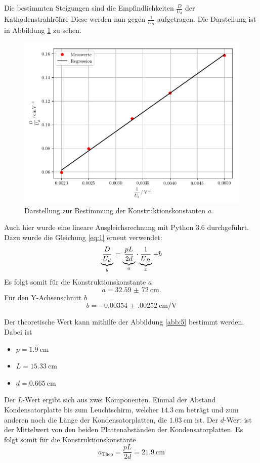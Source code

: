 Die bestimmten Steigungen sind die Empfindlichkeiten $\frac{D}{U_d}$ der Kathodenstrahlröhre
Diese werden nun gegen $\frac{1}{U_B}$ aufgetragen.
Die Darstellung ist in Abbildung \ref{abb:11} zu sehen.
\begin{figure}[H]
  \centering
  \includegraphics[width=\textwidth]{plot6.pdf}
  \caption{Darstellung zur Bestimmung der Konstruktionskonstanten $a$.}
  \label{abb:11}
\end{figure}
Auch hier wurde eine lineare Ausgleichsrechnung mit Python 3.6 durchgeführt.
Dazu wurde die Gleichung \ref{eq:1} erneut verwendet:
\begin{equation*}
  \underbrace{\frac{D}{U_d}}_{\mathclap{y}} = \underbrace{\frac{pL}{2d}}_{\mathclap{a}} \cdot \underbrace{\frac{1}{U_B}}_{\mathclap{x}} + b
\end{equation*}
Es folgt somit für die Konstruktionskonstante $a$
\begin{equation*}
  a = \SI{32,59(72)}{\centi\meter}.
\end{equation*}
Für den Y-Achsenschnitt $b$
\begin{equation*}
  b = \SI{-0.00354(00252)}{\centi\meter\per\volt}
\end{equation*}

Der theoretische Wert kann mithilfe der Abbildung \ref{abb:5} bestimmt werden.
Dabei ist
\begin{itemize}
  \item $p = \SI{1.9}{\centi\meter}$
  \item $L = \SI{15.33}{\centi\meter}$
  \item $d = \SI{0.665}{\centi\meter}$
\end{itemize}
Der $L$-Wert ergibt sich aus zwei Komponenten. Einmal der Abstand Kondensatorplatte bis
zum Leuchtschirm, welcher $\SI{14.3}{\centi\meter}$ beträgt und zum anderen noch die Länge
der Kondensatorplatten, die $\SI{1.03}{\centi\meter}$ ist.
Der $d$-Wert ist der Mittelwert von den beiden Plattenabständen der Kondensatorplatten.
Es folgt somit für die Konstruktionskonstante
\begin{equation*}
  a_{\text{Theo}} = \frac{pL}{2d} = \SI{21.9}{\centi\meter}
\end{equation*}

